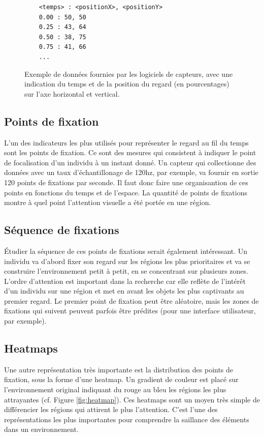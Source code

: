 \documentclass[hidelinks,12pt]{article}
\begin{document}
\begin{figure}[htpb]
  \begin{lstlisting}
    <temps> : <positionX>, <positionY>
    0.00 : 50, 50
    0.25 : 43, 64
    0.50 : 38, 75
    0.75 : 41, 66
    ...
  \end{lstlisting}
  \caption{Exemple de données fournies par les logiciels de capteurs, avec une
    indication du temps et de la position du regard (en pourcentages) sur l'axe
    horizontal et vertical.}
  \label{fig:donnees}
\end{figure}

\subsection{Points de fixation}

L'un des indicateurs les plus utilisés pour représenter le regard au fil du
temps sont les points de fixation. Ce sont des mesures qui consistent à indiquer
le point de focalisation d'un individu à un instant donné. Un capteur qui
collectionne des données avec un taux d'échantillonage de 120hz, par exemple, va
fournir en sortie 120 points de fixations par seconde. Il faut donc faire une
organisantion de ces points en fonctions du temps et de l'espace. La quantité de
points de fixations montre à quel point l'attention visuelle a été portée en une
région.

\subsection{Séquence de fixations}

Étudier la séquence de ces points de fixations serait également intéressant. Un
individu va d'abord fixer son regard sur les régions les plus prioritaires et va
se construire l'environnement petit à petit, en se concentrant sur plusieurs
zones. L'ordre d'attention est important dans la recherche car elle reflète de
l'intérêt d'un individu sur une région et met en avant les objets les plus
captivants au premier regard. Le premier point de fixation peut être aléatoire,
mais les zones de fixations qui suivent peuvent parfois être prédites (pour
une interface utilisateur, par exemple).

\subsection{Heatmaps}

Une autre représentation très importante est la distribution des points de
fixation, sous la forme d'une heatmap. Un gradient de couleur est placé sur
l'environnement original indiquant du rouge au bleu les régions les plus
attrayantes (cf. Figure \ref{fig:heatmap}). Ces heatmaps sont un moyen très
simple de différencier les régions qui attirent le plus l'attention. C'est
l'une des représentations les plus importantes pour comprendre la saillance des
éléments dans un environnement.
\end{document}
